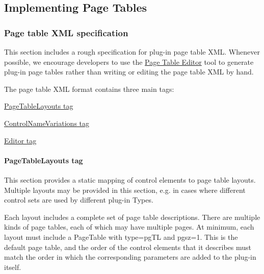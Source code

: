 \hypertarget{a00363_aax_page_table_guide_05_implementing_page_tables}{}\subsection{Implementing Page Tables}\label{a00363_aax_page_table_guide_05_implementing_page_tables}
\hypertarget{a00363_subsection_page_table_xml_specification}{}\subsubsection{Page table X\+M\+L specification}\label{a00363_subsection_page_table_xml_specification}
This section includes a rough specification for plug-\/in page table X\+M\+L. Whenever possible, we encourage developers to use the \hyperlink{a00363_subsection_creating_page_tables_in_pete}{Page Table Editor} tool to generate plug-\/in page tables rather than writing or editing the page table X\+M\+L by hand.

The page table X\+M\+L format contains three main tags\+:


\begin{DoxyItemize}
\item \hyperlink{a00363_subsubsection_pagetablelayouts_tag}{Page\+Table\+Layouts tag}
\item \hyperlink{a00363_subsubsection_controlnamesvariations_tag}{Control\+Name\+Variations tag}
\item \hyperlink{a00363_subsubsection_editor_tag}{Editor tag}
\end{DoxyItemize}

\hypertarget{a00363_subsubsection_pagetablelayouts_tag}{}\paragraph{Page\+Table\+Layouts tag}\label{a00363_subsubsection_pagetablelayouts_tag}
This section provides a static mapping of control elements to page table layouts. Multiple layouts may be provided in this section, e.\+g. in cases where different control sets are used by different plug-\/in Types.

Each layout includes a complete set of page table descriptions. There are multiple kinds of page tables, each of which may have multiple pages. At minimum, each layout must include a {\ttfamily Page\+Table} with {\ttfamily type=\textquotesingle{}pg\+T\+L\textquotesingle{}} and {\ttfamily pgsz=\textquotesingle{}1\textquotesingle{}}. This is the default page table, and the order of the control elements that it describes must match the order in which the corresponding parameters are added to the plug-\/in itself.

